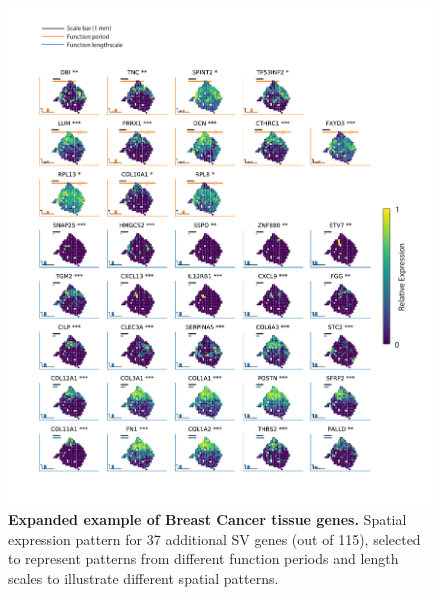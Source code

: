 \graphicspath{{Appendix4/Figs/}}

\begin{figure}
    \centering
    \includegraphics[width=\textwidth]{"SuppFig1"}
    \caption[Expanded example of Breast Cancer tissue genes]{\textbf{Expanded example of Breast Cancer tissue genes.} Spatial expression pattern for 37 additional SV genes (out of 115), selected to represent patterns from different function periods and length scales to illustrate different spatial patterns.}
    \label{fig:ss1}
\end{figure}

